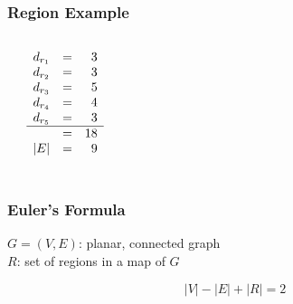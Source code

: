 \documentclass[dvipsnames]{beamer}
\begin{document}
\begin{frame}
  \frametitle{Region Example}

  \begin{columns}
    \begin{center}
    \end{center}

    $\begin{array}{rcr}
      d_{r_1} & = & 3\\
      d_{r_2} & = & 3\\
      d_{r_3} & = & 5\\
      d_{r_4} & = & 4\\
      d_{r_5} & = & 3\\\hline
              & = & 18\\
      \medskip
      |E|     & = & 9
    \end{array}$
  \end{columns}
\end{frame}

\begin{frame}
  \frametitle{Euler's Formula}

  \begin{theorem}
    $G=(V,E)$: planar, connected graph\\
    $R$: set of regions in a map of $G$

    \[|V| - |E| + |R| = 2\]
  \end{theorem}
\end{frame}
\end{document}
